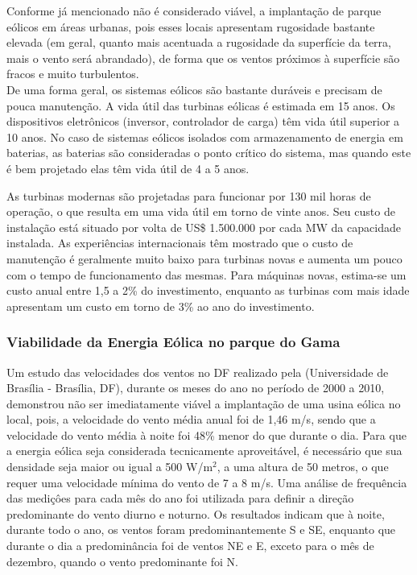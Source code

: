 Conforme j\'a mencionado  n\~ao \'e considerado vi\'avel, a implanta\c{c}\~ao de parque e\'olicos em \'areas urbanas, pois esses locais  apresentam rugosidade bastante elevada (em geral, quanto mais acentuada a rugosidade da superf\'icie da terra, mais o vento ser\'a abrandado), de forma que os ventos pr\'oximos \`a superf\'icie s\~ao fracos e muito turbulentos. \\ De uma forma geral, os sistemas e\'olicos s\~ao bastante dur\'aveis e precisam de pouca manuten\c{c}\~ao. A vida \'util das turbinas e\'olicas \'e estimada em 15 anos. Os dispositivos eletr\^onicos (inversor, controlador de carga) t\^em vida \'util superior a 10 anos. No caso de sistemas e\'olicos isolados com armazenamento de energia em baterias, as baterias s\~ao consideradas o ponto cr\'itico do sistema, mas quando este \'e bem projetado elas t\^em vida \'util de 4 a 5 anos.

	As turbinas modernas s\~ao projetadas para funcionar por 130 mil horas de opera\c{c}\~ao, o que resulta em uma vida \'util em torno de vinte anos. Seu custo de instala\c{c}\~ao est\'a situado por volta de US\$ 1.500.000 por cada MW da capacidade instalada. As experi\^encias internacionais t\^em mostrado que o custo de manuten\c{c}\~ao \'e geralmente muito baixo para turbinas novas e aumenta um pouco com o tempo de funcionamento das mesmas. Para m\'aquinas novas, estima-se um custo anual entre 1,5 a 2\% do investimento, enquanto as turbinas com mais idade apresentam um custo em torno de 3\% ao ano do investimento. \\

\subsubsection{Viabilidade da Energia E\'olica no parque do Gama}

Um estudo das velocidades dos ventos no DF realizado pela (Universidade de Bras\'ilia - Bras\'ilia, DF), durante os meses do ano no per\'iodo de 2000 a 2010, demonstrou n\~ao ser imediatamente vi\'avel a implanta\c{c}\~ao de uma usina e\'olica no local, pois, a velocidade do vento m\'edia anual foi de 1,46 m/s, sendo que a velocidade do vento m\'edia \`a noite foi 48\% menor do que durante o dia. Para que a energia e\'olica seja considerada tecnicamente aproveit\'avel, \'e necess\'ario que sua densidade seja maior ou igual a 500 W/m$^{2}$, a uma altura de 50 metros, o que requer uma velocidade m\'inima do vento de 7 a 8 m/s. 
Uma an\'alise de frequ\^encia das medi\c{c}\^oes para cada m\^es do ano foi utilizada para definir a dire\c{c}\~ao predominante do vento diurno e noturno. Os resultados indicam que \`a noite, durante todo o ano, os ventos foram predominantemente S e SE, enquanto que durante o dia a predomin\^ancia foi de ventos NE e E, exceto para o m\^es de dezembro, quando o vento predominante foi N. \\

